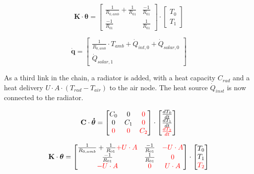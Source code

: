 \begin{equation}
	\mathbf{K} \cdot \boldsymbol{\theta} =
	\begin{bmatrix}
		\frac{1}{R_{0, amb}} + \frac{1}{R_{01}} & \frac{-1}{R_{01}} \\
		\frac{-1}{R_{01}} &  \frac{1}{R_{01}}
	\end{bmatrix}
	\cdot
	\begin{bmatrix}
		T_{0} \\
		T_{1}
	\end{bmatrix}
\end{equation}

\begin{equation}
	\mathbf{\dot{q}} =
	\begin{bmatrix}
		\frac{1}{R_{0, amb}} \cdot T_{amb} + \dot{Q}_{int, 0} + \dot{Q}_{solar, 0} \\
		\dot{Q}_{solar, 1}
	\end{bmatrix}
\end{equation}

As a third link in the chain, a radiator is added, with a heat capacity $C_{rad}$ and a heat delivery $U \cdot A \cdot (T_{rad} - T_{air})$ to the air node. The heat source $\dot{Q}_{inst}$ is now connected to the radiator.

\begin{equation}
	\mathbf{C} \cdot \boldsymbol{\dot{\theta}} =
	\begin{bmatrix}
		C_{0} & 0 & \color{red} 0 \\
		0 &  C_{1} & \color{red} 0  \\
		\color{red} 0 & \color{red} 0 & \color{red} C_{2} 
	\end{bmatrix}
	\cdot
	\begin{bmatrix}
		\frac{dT_{0}}{dt} \\
		\frac{dT_{1}}{dt} \\
		\color{red}\frac{dT_{2}}{dt} 
	\end{bmatrix}
\end{equation}

\begin{equation}
	\mathbf{K} \cdot \boldsymbol{\theta} =
	\begin{bmatrix}
		\frac{1}{R_{0, amb}} + \frac{1}{R_{01}} {\color{red}+ U \cdot A} & \frac{-1}{R_{01}} & {\color{red}-U \cdot A}  \\
		\frac{-1}{R_{01}} &  \frac{1}{R_{01}}  & \color{red} 0  \\
		{\color{red}-U \cdot A} & \color{red} 0 & {\color{red}U \cdot A }
	\end{bmatrix}
	\cdot
	\begin{bmatrix}
		T_{0} \\
		T_{1} \\
	   \color{red}T_{2}
	\end{bmatrix}
\end{equation}

